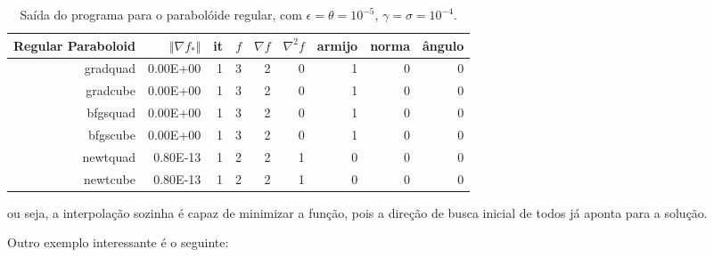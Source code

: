 \documentclass[a4paper,11pt]{article}
\begin{document}
        \begin{table}[h!]
            \centering
            \begin{tabular}{r|rrrrrrrr}
                Regular Paraboloid & $\Vert\nabla f_*\Vert$ & it & $f$ & $\nabla f $ & $\nabla^2f$ & armijo & norma & ângulo \\
                \hline
                gradquad&  0.00E+00&         1&         3&         2&         0&         1&         0&         0 \\
                gradcube&  0.00E+00&         1&         3&         2&         0&         1&         0&         0 \\
                bfgsquad&  0.00E+00&         1&         3&         2&         0&         1&         0&         0 \\
                bfgscube&  0.00E+00&         1&         3&         2&         0&         1&         0&         0 \\
                newtquad&  0.80E-13&         1&         2&         2&         1&         0&         0&         0 \\
                newtcube&  0.80E-13&         1&         2&         2&         1&         0&         0&         0 \\
            \end{tabular}
            \caption{Saída do programa para o parabolóide regular, com $\epsilon = \theta = 10^{-5} $, $\gamma = \sigma = 10^{-4}$.}
        \end{table}
        ou seja, a interpolação sozinha é capaz de minimizar a função, pois a direção de busca inicial de todos já aponta para a solução.

        \newpage
        Outro exemplo interessante é o seguinte:
\end{document}
